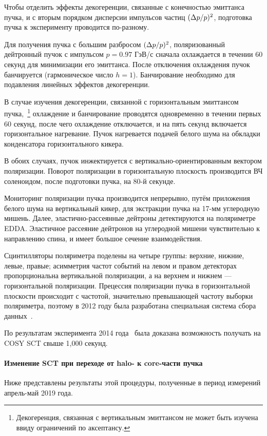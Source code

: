 Чтобы отделить эффекты декогеренции, связанные с конечностью эмиттанса пучка, и с вторым порядком дисперсии импульсов частиц $(\Delta p/p)^2$, подготовка пучка к эксперименту проводится по-разному.

Для получения пучка с большим разбросом $(\Delta p/p)^2$, поляризованный дейтронный пучок с импульсом $p=0.97$ ГэВ/с сначала охлаждается в течении 60 секунд для минимизации его эмиттанса. После отключения охлаждения пучок банчируется (гармоническое число $h=1$). Банчирование необходимо для подавления линейных эффектов декогеренции.

В случае изучения декогеренции, связанной с горизонтальным эмиттансом пучка,~\footnote{Декогеренция, связанная с вертикальным эмиттансом не может быть изучена ввиду ограничений по аксептансу.} охлаждение и банчирование проводятся одновременно в течении первых 60 секунд, после чего охлаждение отключается, и на пять секунд включается горизонтальное нагревание. Пучок нагревается подачей белого шума на обкладки конденсатора горизонтального кикера.

В обоих случаях, пучок инжектируется с вертикально-ориентированным вектором поляризации. Поворот поляризации в горизонтальную плоскость производится ВЧ соленоидом, после подготовки пучка, на 80-й секунде.

Мониторинг поляризации пучка производится непрерывно, путём приложения белого шума на вертикальный кикер, для экстракции пучка на 17-мм углеродную мишень. Далее, эластично-рассеянные дейтроны детектируются на поляриметре EDDA. Эластичное рассеяние дейтронов на углеродной мишени чувствительно к направлению спина, и имеет большое сечение взаимодействия. 

Сцинтилляторы поляриметра поделены на четыре группы: верхние, нижние, левые, правые; асимметрия частот событий на левом и правом детекторах пропорциональна вертикальной поляризации, а на верхнем и нижнем --- горизонтальной поляризации. Прецессия поляризации пучка в горизонтальной плоскости происходит с частотой, значительно превышающей частоту выборки поляриметра, поэтому в 2012 году была разработана специальная система сбора данных~\cite{COSY:SCT:DAQ}.

По результатам эксперимента 2014 года~\cite{Guidoboni:STORI14} была доказана возможность получать на COSY SCT свыше 1,000 секунд. 

\paragraph{Изменение SCT при переходе от halo- к core-части пучка}
Ниже представлены результаты  этой процедуры, полученные в период измерений апрель-май 2019 года.